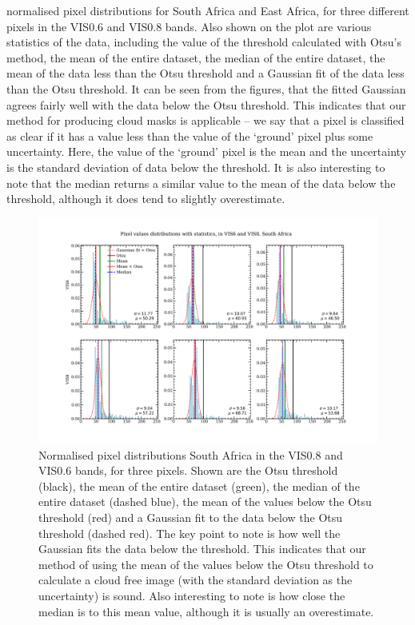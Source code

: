 normalised pixel distributions for South Africa and East Africa, for
three different pixels in the VIS0.6 and VIS0.8 bands. Also shown on
the plot are various statistics of the data, including the value of
the threshold calculated with Otsu's method, the mean of the entire
dataset, the median of the entire dataset, the mean of the data less
than the Otsu threshold and a Gaussian fit of the data less than the
Otsu threshold. It can be seen from the figures, that the fitted
Gaussian agrees fairly well with the data below the Otsu
threshold. This indicates that our method for producing cloud masks is
applicable -- we say that a pixel is classified as clear if it has a
value less than the value of the `ground' pixel plus some
uncertainty. Here, the value of the `ground' pixel is the mean and the
uncertainty is the standard deviation of data below the threshold. It
is also interesting to note that the median returns a similar value to
the mean of the data below the threshold, although it does tend to
slightly overestimate.
\begin{figure}
  \centering
  \includegraphics[width=\textwidth]{figures/pixel_distributions_stats_capetown}
  \caption{Normalised pixel distributions South Africa in the VIS0.8
    and VIS0.6 bands, for three pixels. Shown are the Otsu threshold
    (black), the mean of the entire dataset (green), the median of the
    entire dataset (dashed blue), the mean of the values below the
    Otsu threshold (red) and a Gaussian fit to the data below the Otsu
    threshold (dashed red). The key point to note is how well the
    Gaussian fits the data below the threshold. This indicates that
    our method of using the mean of the values below the Otsu
    threshold to calculate a cloud free image (with the standard
    deviation as the uncertainty) is sound. Also interesting to note
    is how close the median is to this mean value, although it is
    usually an overestimate.}
  \label{fig:pix_d_south}
\end{figure}

